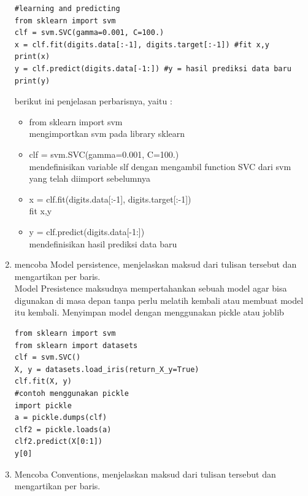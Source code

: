 \begin{enumerate}
\begin{lstlisting}
#learning and predicting
from sklearn import svm
clf = svm.SVC(gamma=0.001, C=100.)
x = clf.fit(digits.data[:-1], digits.target[:-1]) #fit x,y
print(x)
y = clf.predict(digits.data[-1:]) #y = hasil prediksi data baru
print(y)
\end{lstlisting}
berikut ini penjelasan perbarisnya, yaitu :\\
\begin{itemize}
    \item from sklearn import svm\\
    mengimportkan svm pada library sklearn
    \item clf = svm.SVC(gamma=0.001, C=100.)\\
    mendefinisikan variable slf dengan mengambil function SVC dari svm yang telah diimport sebelumnya
    \item x = clf.fit(digits.data[:-1], digits.target[:-1]) \\
    fit x,y
    \item y = clf.predict(digits.data[-1:])\\
mendefinisikan hasil prediksi data baru
\end{itemize}
\item 
mencoba Model persistence, menjelaskan maksud dari tulisan tersebut dan mengartikan per baris.\\
Model Presistence maksudnya mempertahankan sebuah model agar bisa digunakan di masa depan tanpa perlu melatih kembali atau membuat model itu kembali. Menyimpan model dengan menggunakan pickle atau joblib
\begin{lstlisting}
from sklearn import svm
from sklearn import datasets
clf = svm.SVC()
X, y = datasets.load_iris(return_X_y=True)
clf.fit(X, y)
#contoh menggunakan pickle
import pickle
a = pickle.dumps(clf)
clf2 = pickle.loads(a)
clf2.predict(X[0:1])
y[0]
\end{lstlisting}
\item 
Mencoba Conventions, menjelaskan maksud dari tulisan tersebut dan mengartikan per baris.\\


\end{enumerate}
